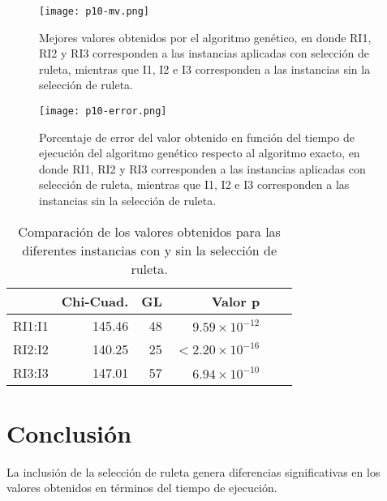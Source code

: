 \documentclass{article}
\begin{document}
\begin{figure}[ptb]
\begin{center}
\texttt{[image: p10-mv.png]}
\end{center}
\caption{Mejores valores obtenidos por el algoritmo genético, en donde RI1, RI2 y RI3 corresponden a las instancias aplicadas con selección de ruleta, mientras que I1, I2 e I3 corresponden a las instancias sin la selección de ruleta.\label{mv}}
\end{figure}

\begin{figure}[ptb]
\begin{center}
\texttt{[image: p10-error.png]}
\end{center}
\caption{Porcentaje de error del valor obtenido en función del tiempo de ejecución del algoritmo genético respecto al algoritmo exacto, en donde RI1, RI2 y RI3 corresponden a las instancias aplicadas con selección de ruleta, mientras que I1, I2 e I3 corresponden a las instancias sin la selección de ruleta.\label{error}}
\end{figure}

\begin{table}[h]
\begin{center}
\caption{Comparación de los valores obtenidos para las diferentes instancias con y sin la selección de ruleta.}
\label{kw}
\begin{tabular}{r r r r r r}
\hline
 &\textbf{Chi-Cuad.}&\textbf{GL}&\textbf{Valor p}\\
\hline
RI1:I1&145.46&48&$9.59\times10^{-12}$\\
RI2:I2&140.25&25&$<2.20\times10^{-16}$\\
RI3:I3&147.01&57&$6.94\times10^{-10}$\\
\hline
\end{tabular}
\end{center}
\end{table}

\section{Conclusión}
La inclusión de la selección de ruleta genera diferencias significativas en los valores obtenidos en términos del tiempo de ejecución.



\end{document}
